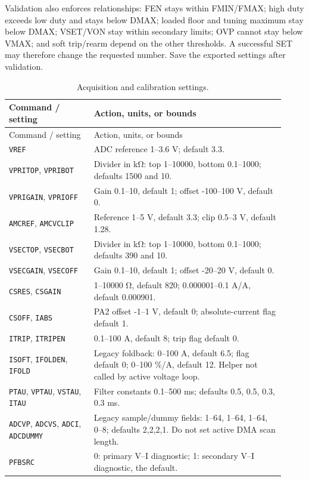 Validation also enforces relationships: FEN stays within FMIN/FMAX; high duty exceeds low duty and stays below DMAX; loaded floor and tuning maximum stay below DMAX; VSET/VON stay within secondary limits; OVP cannot stay below VMAX; and soft trip/rearm depend on the other thresholds. A successful SET may therefore change the requested number. Save the exported settings after validation.
\begingroup
\small
\begin{longtable}{@{}L{0.29\linewidth}L{0.63\linewidth}@{}}
\caption{Acquisition and calibration settings.}\label{tab:app-fw-calibration}\\
\toprule Command / setting & Action, units, or bounds\\\midrule
\endfirsthead
\toprule Command / setting & Action, units, or bounds\\\midrule
\endhead
\texttt{VREF} & ADC reference 1--3.6 V; default 3.3.\\
\texttt{VPRITOP}, \texttt{VPRIBOT} & Divider in \si{\kilo\ohm}: top 1--10000, bottom 0.1--1000; defaults 1500 and 10.\\
\texttt{VPRIGAIN}, \texttt{VPRIOFF} & Gain 0.1--10, default 1; offset -100--100 V, default 0.\\
\texttt{AMCREF}, \texttt{AMCVCLIP} & Reference 1--5 V, default 3.3; clip 0.5--3 V, default 1.28.\\
\texttt{VSECTOP}, \texttt{VSECBOT} & Divider in \si{\kilo\ohm}: top 1--10000, bottom 0.1--1000; defaults 390 and 10.\\
\texttt{VSECGAIN}, \texttt{VSECOFF} & Gain 0.1--10, default 1; offset -20--20 V, default 0.\\
\texttt{CSRES}, \texttt{CSGAIN} & 1--10000 \si{\ohm}, default 820; 0.000001--0.1 A/A, default 0.000901.\\
\texttt{CSOFF}, \texttt{IABS} & PA2 offset -1--1 V, default 0; absolute-current flag default 1.\\
\texttt{ITRIP}, \texttt{ITRIPEN} & 0.1--100 A, default 8; trip flag default 0.\\
\texttt{ISOFT}, \texttt{IFOLDEN}, \texttt{IFOLD} & Legacy foldback: 0--100 A, default 6.5; flag default 0; 0--100 \%/A, default 12. Helper not called by active voltage loop.\\
\texttt{PTAU}, \texttt{VPTAU}, \texttt{VSTAU}, \texttt{ITAU} & Filter constants 0.1--500 ms; defaults 0.5, 0.5, 0.3, 0.3 ms.\\
\texttt{ADCVP}, \texttt{ADCVS}, \texttt{ADCI}, \texttt{ADCDUMMY} & Legacy sample/dummy fields: 1--64, 1--64, 1--64, 0--8; defaults 2,2,2,1. Do not set active DMA scan length.\\
\texttt{PFBSRC} & 0: primary V--I diagnostic; 1: secondary V--I diagnostic, the default.\\
\bottomrule
\end{longtable}
